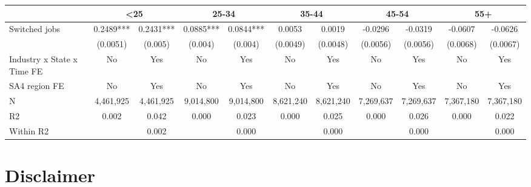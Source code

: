 \documentclass[11pt,twocolumn,openany,leqno]{e61-research-note}
\begin{document}
\begin{appendix}
{\begin{table*}[p]
\begin{tabular}{lcccccccccc}
\cmidrule(lr){2-3} \cmidrule(lr){4-5} \cmidrule(lr){6-7} \cmidrule(lr){8-9} \cmidrule(lr){10-11}          & \multicolumn{2}{c}{<25} & \multicolumn{2}{c}{25-34} & \multicolumn{2}{c}{35-44} & \multicolumn{2}{c}{45-54} & \multicolumn{2}{c}{55+} \\
    \midrule
    Switched jobs & 0.2489*** & 0.2431*** & 0.0885*** & 0.0844*** & 0.0053 & 0.0019 & -0.0296 & -0.0319 & -0.0607 & -0.0626 \\
          & (0.0051) & (0.005) & (0.004) & (0.004) & (0.0049) & (0.0048) & (0.0056) & (0.0056) & (0.0068) & (0.0067) \\
    \midrule
    Industry x State x Time FE & No    & Yes   & No    & Yes   & No    & Yes   & No    & Yes   & No    & Yes \\
    SA4 region FE & No    & Yes   & No    & Yes   & No    & Yes   & No    & Yes   & No    & Yes \\
    \midrule
    N     & 4,461,925 & 4,461,925 & 9,014,800 & 9,014,800 & 8,621,240 & 8,621,240 & 7,269,637 & 7,269,637 & 7,367,180 & 7,367,180 \\
    R2    & 0.002 & 0.042 & 0.000 & 0.023 & 0.000 & 0.025 & 0.000 & 0.026 & 0.000 & 0.022 \\
    Within R2 &       & 0.002 &       & 0.000 &       & 0.000 &       & 0.000 &       & 0.000 \\
    \bottomrule
    \end{tabular}%
  \label{tab:wages1}%
\end{table*}%
}

\chapter{Disclaimer}


\end{appendix}
\end{document}
